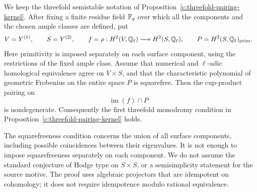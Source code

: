 \begin{proposition}
\label{c:threefold-simple-spectrum}
We keep the threefold semistable notation of
Proposition~\ref{c:threefold-pairing-kernel}. After fixing a finite
residue field $\mathbb F_q$ over which all the components and the chosen ample
classes are defined, put
\[
 V=Y^{(1)},\qquad S=Y^{(2)},\qquad
 f=\rho:H^2(V,\mathbb Q_\ell)\longrightarrow H^2(S,\mathbb Q_\ell),
 \qquad P=H^2(S,\mathbb Q_\ell)_{\rm prim}.
\]
Here primitivity is imposed separately on each surface component, using
the restrictions of the fixed ample class. Assume that numerical and
$\ell$-adic homological equivalence agree on $V\times S$, and that
the characteristic polynomial of geometric Frobenius on the entire
space $P$ is squarefree. Then the cup-product pairing on
\[
 \operatorname{im}(f)\cap P
\]
is nondegenerate. Consequently the first threefold monodromy condition
in Proposition~\ref{c:threefold-pairing-kernel} holds.

The squarefreeness condition concerns the union of all surface
components, including possible coincidences between their eigenvalues.
It is not enough to impose squarefreeness separately on each component.
We do not assume the standard conjecture of Hodge type on $S\times S$,
or a semisimplicity statement for the source motive. The proof uses
algebraic projectors that are idempotent on cohomology; it does not
require idempotence modulo rational equivalence.
\end{proposition}

